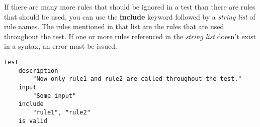

If there are many more rules that should be ignored in a test than there are
rules that should be used, you can use the \textbf{include} keyword
followed by a \textit{string list} of rule names. The rules mentioned in that 
list are the rules that are used throughout the test. If one or more rules 
referenced in the \textit{string list} doesn't exist in a syntax, an error must
be issued.
\clearpage

\begin{lstlisting}[style = SrtL]
test
    description
        "Now only rule1 and rule2 are called throughout the test."
    input 
        "Some input"
    include
        "rule1", "rule2"
    is valid
\end{lstlisting}
